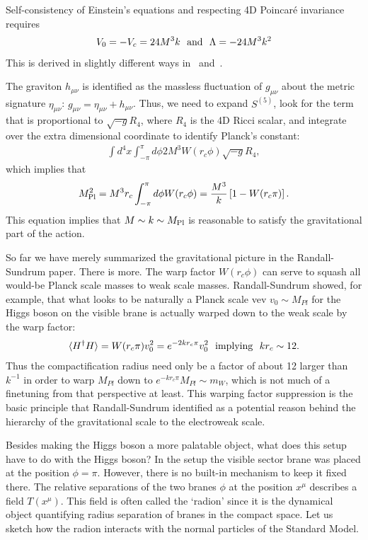 \documentclass[12pt]{article}
\def\beq{\begin{eqnarray}}
\def\eeq{\end{eqnarray}}
\def\bea{\begin{eqnarray}}
\def\eea{\end{eqnarray}}
\begin{document}
Self-consistency of Einstein's equations and respecting 4D Poincar\'e invariance requires 
\beq
V_0=-V_c=24M^3k~~{\rm and}~~\Lambda=-24M^3k^2
\eeq
This is derived in slightly different ways in~\cite{Randall:1999ee}  and~\cite{Csaki:2004ay}.

The graviton $h_{\mu\nu}$ is identified as the massless fluctuation of $g_{\mu\nu}$ about the metric signature $\eta_{\mu\nu}$: $g_{\mu\nu}=\eta_{\mu\nu}+h_{\mu\nu}$. Thus, we need to expand $S^{(5)}$, look for the term that is proportional to $\sqrt{-g}R_4$, where $R_4$ is the 4D Ricci scalar, and integrate over the extra dimensional coordinate to identify Planck's constant: 
\bea
\int d^4x\int_{-\pi}^{\pi} d\phi 2M^3W(r_c\phi)\sqrt{-g}R_4,
\eea
which implies that
\bea
M_{\rm Pl}^2=M^3r_c\int_{-\pi}^{\pi} d\phi W(r_c\phi)=\frac{M^3}{k}\left[ 1-W(r_c\pi)\right].
\eea
This equation implies that  $M\sim k\sim M_{\rm Pl}$ is reasonable to satisfy the gravitational part of the action.

So far we have merely summarized the gravitational picture in the Randall-Sundrum paper.  There is more. The warp factor $W(r_c\phi)$ can serve to squash all would-be Planck scale masses to weak scale masses. Randall-Sundrum showed, for example, that what looks to be naturally a Planck scale vev $v_0\sim M_{Pl}$ for the Higgs boson on the visible brane is actually warped down to the weak scale by the warp  factor:
\beq
\langle H^\dagger H\rangle =W(r_c\pi)v^2_0=e^{-2kr_c\pi}v^2_0~~{\rm implying}~~kr_c\sim 12.
\eeq
Thus the compactification radius need only be a factor of about 12 larger than $k^{-1}$ in order to warp $M_{Pl}$ down to $e^{-kr_c\pi}M_{Pl}\sim m_W$,  which is not much of a finetuning from that perspective at least. This warping factor suppression is the basic principle that Randall-Sundrum identified as a potential reason behind the hierarchy of the gravitational scale to the electroweak scale.

Besides making the Higgs boson a more palatable object, what does this setup have to do with the Higgs boson? In the setup the visible sector brane was placed at the position $\phi=\pi$. However, there is no built-in mechanism to keep it fixed there. The relative separations of the two branes $\phi$ at the position $x^\mu$ describes a field $T(x^\mu)$. This field is often called the `radion' since it is the dynamical object quantifying radius separation of branes in  the compact space.   Let us sketch how the radion interacts with the normal particles of the Standard Model.
\end{document}
